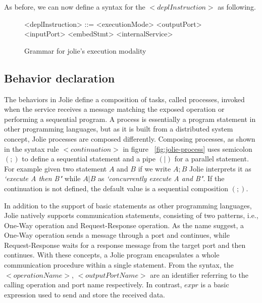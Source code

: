 






As before, we can now define a syntax for the \(<deplInstruction>\) as following.

\begin{figure}[h]
    \begin{framed}
        \begin{grammar}
            <deplInstruction> ::= <executionMode>
            \alt <outputPort>
            \alt <inputPort>
            \alt <embedStmt>
            \alt <internalService>
        \end{grammar}
    \end{framed}
    \caption{Grammar for jolie's execution modality}
    \label{fig:jolie-depl}
\end{figure}


\subsection{Behavior declaration}
\label{sec:jolie-behavior}

The behaviors in Jolie define a composition of tasks, called processes, invoked when the service receives a message matching the exposed operation or performing a sequential program. A process is essentially a program statement in other programming languages, but as it is built from a distributed system concept, Jolie processes are composed differently. Composing processes, as shown in the syntax rule \(<continuation>\) in figure ~\ref{fig:jolie-process}  uses semicolon \((;)\) to define a sequential statement and a pipe \((|)\) for a parallel statement. For example given two statement \(A\) and \(B\) if we write \(A ; B\) Jolie interprets it as \textit{`execute A then B"} while \(A | B\) as \textit{`concurrently execute A and B"}. If the continuation is not defined, the default value is a sequential composition \((;)\).

In addition to the support of basic statements as other programming languages, Jolie natively supports communication statements, consisting of two patterns, i.e., One-Way operation and Request-Response operation. As the name suggest, a One-Way operation sends a message through a port and continues, while Request-Response waits for a response message from the target port and then continues. With these concepts, a Jolie program encapsulates a whole communication procedure within a single statement. From the syntax, the \(<operationName>\), \(<outputPortName>\) are an identifier referring to the calling operation and port name respectively. In contrast, \(expr\) is a basic expression used to send and store the received data.

